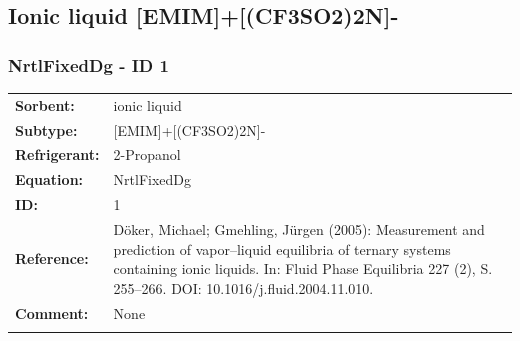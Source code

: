 \subsection{Ionic liquid [EMIM]+[(CF3SO2)2N]-}
%
\subsubsection{NrtlFixedDg - ID 1}
%
\begin{tabular}[l]{|lp{11.5cm}|}
\hline
\addlinespace

\textbf{Sorbent:} & ionic liquid \\
\textbf{Subtype:} & [EMIM]+[(CF3SO2)2N]- \\
\textbf{Refrigerant:} & 2-Propanol \\
\textbf{Equation:} & NrtlFixedDg \\
\textbf{ID:} & 1 \\
\textbf{Reference:} & Döker, Michael; Gmehling, Jürgen (2005): Measurement and prediction of vapor–liquid equilibria of ternary systems containing ionic liquids. In: Fluid Phase Equilibria 227 (2), S. 255–266. DOI: 10.1016/j.fluid.2004.11.010. \\
\textbf{Comment:} & None \\

\addlinespace
\hline
\end{tabular}
\newline

